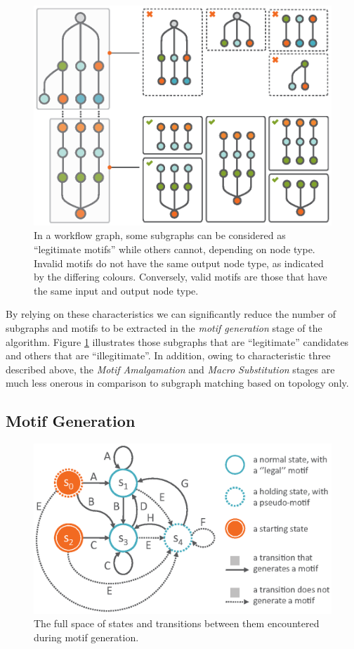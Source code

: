 \begin{figure}[t!]
\centering
\includegraphics[scale=.6]{images/automacron/valid-invalid-motifs.eps}
\caption{In a workflow graph, some subgraphs can be considered as ``legitimate motifs'' while others cannot, depending on node type. Invalid motifs do not have the same output node type, as indicated by the differing colours. Conversely, valid motifs are those that have the same input and output node type.}
\vspace{-3mm}
\label{fig:Conditions}
\end{figure}


By relying on these characteristics we can significantly reduce the number of subgraphs and motifs to be extracted in the \emph{motif generation} stage of the algorithm.
Figure \ref{fig:Conditions} illustrates those subgraphs that are ``legitimate'' candidates and others that are ``illegitimate''.
In addition, owing to characteristic three described above, the \emph{Motif Amalgamation} and \emph{Macro Substitution} stages are much less onerous in comparison to subgraph matching based on topology only. 

\subsection{Motif Generation}
\label{sec:automacron_algorithm}
%
\begin{figure}[t!]
\centering
\includegraphics[width=.65\textwidth]{images/automacron/Transition.eps}
\caption{The full space of states and transitions between them encountered during motif generation.}
\label{fig:Transitions}
\end{figure}

